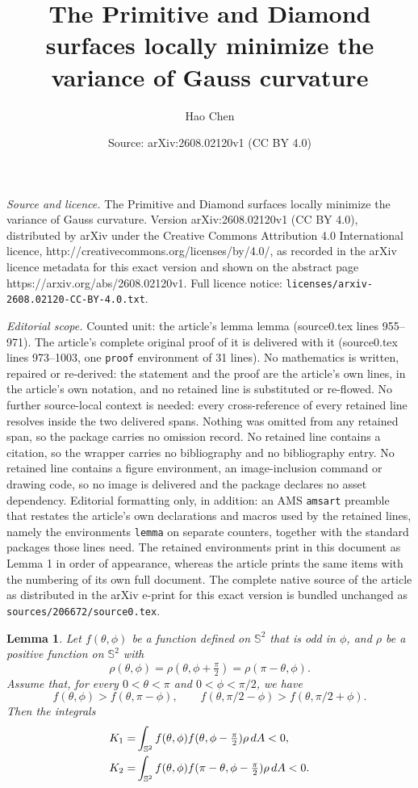 \documentclass[10pt,a4paper]{amsart}
\title{The Primitive and Diamond surfaces locally minimize the variance of Gauss curvature}
\author{Hao Chen}
\date{Source: arXiv:2608.02120v1 (CC BY 4.0)}
\newtheorem{lemma}{Lemma}
\newcommand{\dd}{{\rm d}}
\newcommand{\uS}{\mathbb{S}}
\begin{document}
\maketitle

\noindent\emph{Source and licence.} The Primitive and Diamond surfaces locally minimize the variance of Gauss curvature. Version arXiv:2608.02120v1 (CC BY 4.0), distributed by arXiv under the Creative Commons Attribution 4.0 International licence, http://creativecommons.org/licenses/by/4.0/, as recorded in the arXiv licence metadata for this exact version and shown on the abstract page https://arxiv.org/abs/2608.02120v1. Full licence notice: \texttt{licenses/arxiv-2608.02120-CC-BY-4.0.txt}.\par\smallskip

\noindent\textit{Editorial scope.} Counted unit: the article's lemma lemma (source0.tex lines 955--971). The article's complete original proof of it is delivered with it (source0.tex lines 973--1003, one \texttt{proof} environment of 31 lines). No mathematics is written, repaired or re-derived: the statement and the proof are the article's own lines, in the article's own notation, and no retained line is substituted or re-flowed.  No further source-local context is needed: every cross-reference of every retained line resolves inside the two delivered spans.  Nothing was omitted from any retained span, so the package carries no omission record.  No retained line contains a citation, so the wrapper carries no bibliography and no bibliography entry.  No retained line contains a figure environment, an image-inclusion command or drawing code, so no image is delivered and the package declares no asset dependency.  Editorial formatting only, in addition: an AMS \texttt{amsart} preamble that restates the article's own declarations and macros used by the retained lines, namely the environments \texttt{lemma} on separate counters, together with the standard packages those lines need.  The retained environments print in this document as Lemma 1 in order of appearance, whereas the article prints the same items with the numbering of its own full document.  The complete native source of the article as distributed in the arXiv e-print for this exact version is bundled unchanged as \texttt{sources/206672/source0.tex}.
\begin{lemma}
	Let $f(\theta, \phi)$ be a function defined on $\uS^2$ that is odd in $\phi$,
	and $\rho$ be a positive function on $\uS^2$ with
	\[
		\rho(\theta, \phi) = \rho(\theta, \phi+\tfrac{\pi}{2}) = \rho(\pi - \theta, \phi).
	\]
	Assume that, for every $0 < \theta < \pi$ and $0 < \phi < \pi/2$, we have
	\[
		f(\theta, \phi) > f(\theta, \pi - \phi), \qquad
		f(\theta, \pi/2 - \phi) > f(\theta, \pi/2 + \phi).
	\]
	Then the integrals
	\begin{align*}
		K_1 =& \int_{\uS^2} f(\theta, \phi) f(\theta, \phi - \tfrac{\pi}{2}) \rho \, \dd A < 0,\\
		K_2 =& \int_{\uS^2} f(\theta, \phi) f(\pi - \theta, \phi - \tfrac{\pi}{2}) \rho \, \dd A < 0.
	\end{align*}
\end{lemma}
\end{document}

